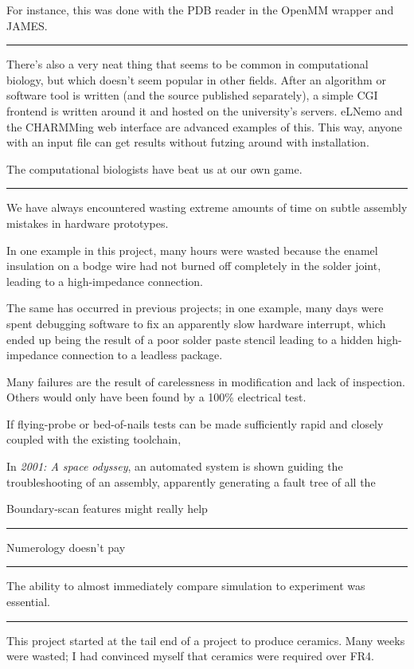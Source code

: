 \documentclass[paper.tex]{subfiles}
\begin{document}
For instance, this was done with the PDB reader in the OpenMM wrapper and JAMES.

\rule{\linewidth}{0.2pt}

There's also a very neat thing that seems to be common in computational biology, but which doesn't seem popular in other fields. After an algorithm or software tool is written (and the source published separately), a simple CGI frontend is written around it and hosted on the university's servers. eLNemo and the CHARMMing web interface are advanced examples of this. This way, anyone with an input file can get results without futzing around with installation. 

The computational biologists have beat us at our own game.

\rule{\linewidth}{0.2pt}

We have always encountered wasting extreme amounts of time on subtle assembly mistakes in hardware prototypes. 

In one example in this project, many hours were wasted because the enamel insulation on a bodge wire had not burned off completely in the solder joint, leading to a high-impedance connection.

The same has occurred in previous projects; in one example, many days were spent debugging software to fix an apparently slow hardware interrupt, which ended up being the result of a poor solder paste stencil leading to a hidden high-impedance connection to a leadless package.

Many failures are the result of carelessness in modification and lack of inspection. Others would only have been found by a 100\% electrical test.

If flying-probe or bed-of-nails tests can be made sufficiently rapid and closely coupled with the existing toolchain, 

In {\it 2001: A space odyssey}, an automated system is shown guiding the troubleshooting of an assembly, apparently generating a fault tree of all the 

Boundary-scan features might really help 

\rule{\linewidth}{0.2pt}

Numerology doesn't pay

\rule{\linewidth}{0.2pt}

The ability to almost immediately compare simulation to experiment was essential.

\rule{\linewidth}{0.2pt}

This project started at the tail end of a project to produce ceramics. Many weeks were wasted; I had convinced myself that ceramics were required over FR4. 
\end{document}
